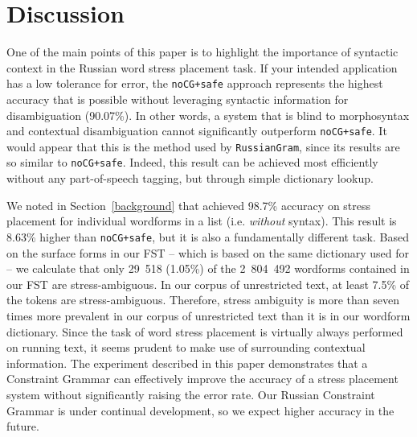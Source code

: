 \documentclass[11pt]{article}
\newcommand{\rr}[1]{\marginpar{\scriptsize R: #1}} %
\begin{document}
\section{Discussion} \label{discussion}

One of the main points of this paper is to highlight the importance of 
syntactic context in the Russian word stress placement task. If your intended 
application has a low tolerance for error, the 
{\small {\tt noCG+safe}} approach represents the highest accuracy that is possible 
without leveraging syntactic information for disambiguation (90.07\%). In other words, a 
system that is blind to morphosyntax and contextual disambiguation cannot
significantly outperform {\small {\tt noCG+safe}}. It would appear that this is
the method used by {\small {\tt RussianGram}}, since its results are so similar
to {\small {\tt noCG+safe}}. Indeed, this result can be achieved most efficiently
without any part-of-speech tagging, but through simple dictionary lookup.

We noted in Section~\ref{background} that 
achieved 98.7\% accuracy on stress placement for individual wordforms 
in a list (i.e. \emph{without} syntax). This result is 8.63\% higher than
{\small {\tt noCG+safe}}, but it is also a fundamentally different task.
Based on the surface 
forms in our FST -- which is based on the same dictionary used for 
 -- 
we calculate that only 29~518 (1.05\%) 
of the 2~804~492 wordforms contained in our FST are stress-ambiguous.
In our corpus of unrestricted text, at least 7.5\% of the tokens are 
stress-ambiguous. Therefore, stress ambiguity is more than seven times more prevalent in our 
corpus of unrestricted text than it is in our wordform dictionary.
Since the task of word stress placement is virtually always performed on
running text, it seems prudent to make use of surrounding contextual information.
The experiment described in this paper demonstrates that a Constraint Grammar
can effectively improve the accuracy of a stress placement system without 
significantly raising the error rate. Our Russian Constraint Grammar is
under continual development, so we expect higher accuracy in the future.
\end{document}
